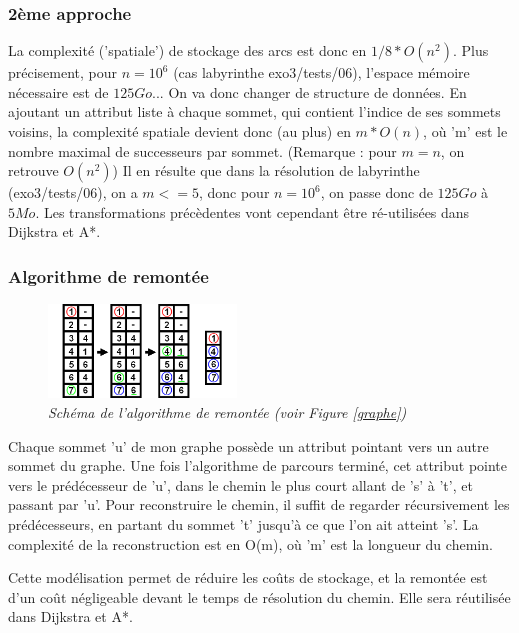 \documentclass[10pt]{article}
\begin{document}
			\subsubsection{2ème approche}
				La complexité ('spatiale') de stockage des arcs est donc en \(1/8*O(n^2)\).
				Plus précisement, pour \(n=10^6\) (cas labyrinthe exo3/tests/06),
				l'espace mémoire nécessaire est de \(125Go\)... On va donc changer de structure de données.
				En ajoutant un attribut liste à chaque sommet, qui contient l'indice de ses sommets voisins,
				la complexité spatiale devient donc (au plus) en \(m * O(n)\), où 'm' est
				le nombre maximal de successeurs par sommet. (Remarque : pour \(m = n\), on retrouve \(O(n^2)\))
				Il en résulte que dans la résolution de labyrinthe (exo3/tests/06), on a \(m <= 5\), donc pour \(n=10^6\),
				on passe donc de \(125Go\) à \(5 Mo\). Les transformations précèdentes vont cependant être ré-utilisées
				dans Dijkstra et A*.
				
			\subsubsection{Algorithme de remontée}

				\begin{figure}
					\includegraphics[width=5cm]{./images/remonte.png}
					\caption{\textit{Schéma de l'algorithme de remontée (voir Figure \ref{graphe})}}
				\end{figure}

				Chaque sommet 'u' de mon graphe possède un attribut pointant vers un autre sommet du graphe.
				Une fois l'algorithme de parcours terminé, cet attribut pointe vers le prédécesseur de 'u',
				dans le chemin le plus court allant de 's' à 't', et passant par 'u'.
				Pour reconstruire le chemin, il suffit de regarder récursivement les prédécesseurs, en partant du sommet
				't' jusqu'à ce que l'on ait atteint 's'.
				La complexité de la reconstruction est en O(m), où 'm' est la longueur du chemin.\newline
				
				Cette modélisation permet de réduire les coûts de stockage, et la remontée est d'un coût
				négligeable devant le temps de résolution du chemin. Elle sera réutilisée dans Dijkstra et A*.
			
\end{document}
